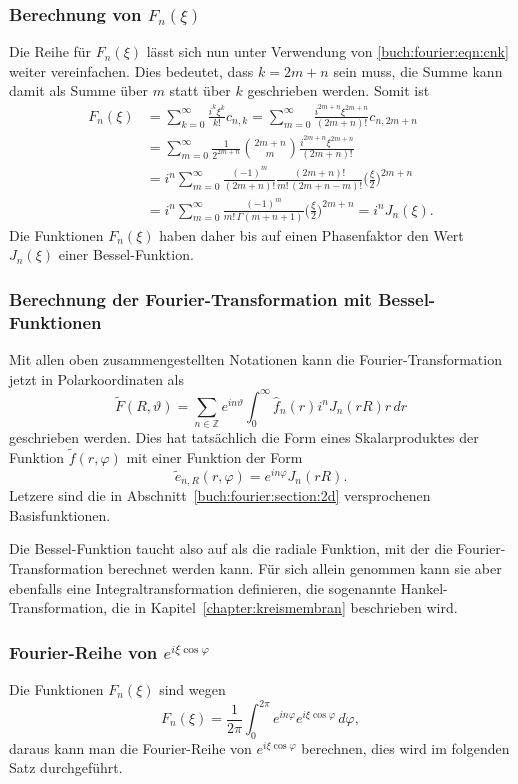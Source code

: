 %
%
\subsubsection{Berechnung von $F_n(\xi)$}
Die Reihe für $F_n(\xi)$ lässt sich nun unter Verwendung
von \eqref{buch:fourier:eqn:cnk} weiter vereinfachen.
Dies bedeutet, dass $k=2m+n$ sein muss, die Summe kann damit als
Summe über $m$ statt über $k$ geschrieben werden.
Somit ist
\begin{align*}
F_n(\xi)
&=
\sum_{k=0}^\infty
\frac{i^k\xi^k}{k!}
c_{n,k}
=
\sum_{m=0}^\infty
\frac{i^{2m+n}\xi^{2m+n}}{(2m+n)!}
c_{n,2m+n}
\\
&=
\sum_{m=0}^\infty
\frac{1}{2^{2m+n}}
\binom{2m+n}{m}
\frac{i^{2m+n}\xi^{2m+n}}{(2m+n)!}
\\
&=
i^n
\sum_{m=0}^\infty
\frac{(-1)^m}{(2m+n)!}
\frac{(2m+n)!}{m!\,(2m+n-m)!}
\biggl(\frac{\xi}{2}\biggr)^{2m+n}
\\
&=
i^n
\sum_{m=0}^\infty
\frac{(-1)^m}
{m!\,\Gamma(m+n+1)}
\biggl(\frac{\xi}{2}\biggr)^{2m+n}
=
i^n J_n(\xi).
\end{align*}
Die Funktionen $F_n(\xi)$ haben daher bis auf einen Phasenfaktor den
Wert $J_n(\xi)$ einer Bessel-Funktion.

%
%
\subsubsection{Berechnung der Fourier-Transformation mit Bessel-Funktionen}
Mit allen oben zusammengestellten Notationen kann die Fourier-Transformation
jetzt in Polarkoordinaten als
\[
\tilde{F}(R,\vartheta)
=
\sum_{n\in\mathbb{Z}}
e^{in\vartheta}
\int_0^\infty 
\hat{f}_n(r)
i^n
J_n(rR)
r\,dr
\]
geschrieben werden.
Dies hat tatsächlich die Form eines Skalarproduktes der Funktion
$\tilde{f}(r,\varphi)$ mit einer Funktion der Form
\[
\tilde{e}_{n,R}(r,\varphi)
=
e^{in\varphi}
J_n(rR).
\]
Letzere sind die in Abschnitt~\ref{buch:fourier:section:2d}
versprochenen Basisfunktionen.

Die Bessel-Funktion taucht also auf als die radiale Funktion,
mit der die Fourier-Transformation berechnet werden kann.
Für sich allein genommen kann sie aber ebenfalls eine Integraltransformation
definieren, die sogenannte Hankel-Transformation, die in
Kapitel~\ref{chapter:kreismembran} beschrieben wird.

%
%
\subsubsection{Fourier-Reihe von $e^{i\xi\cos\varphi}$}
Die Funktionen $F_n(\xi)$ sind wegen
\[
F_n(\xi)
=
\frac{1}{2\pi}
\int_0^{2\pi}
e^{in\varphi}
e^{i\xi\cos\varphi}
\,d\varphi,
\]
daraus kann man die Fourier-Reihe von $e^{i\xi\cos\varphi}$ 
berechnen, dies wird im folgenden Satz durchgeführt.


